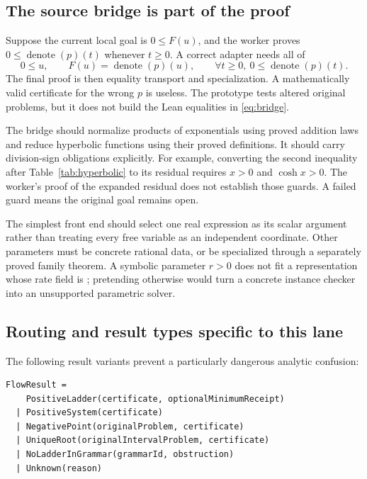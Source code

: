 \subsection{The source bridge is part of the proof}

Suppose the current local goal is $0\le F(u)$, and the worker proves $0\le\operatorname{denote}(p)(t)$ whenever $t\ge0$. A correct adapter needs all of
\begin{equation}
 0\le u,\qquad F(u)=\operatorname{denote}(p)(u),\qquad
 \forall t\ge0,\ 0\le\operatorname{denote}(p)(t).
 \label{eq:bridge}
\end{equation}
The final proof is then equality transport and specialization. A mathematically valid certificate for the wrong $p$ is useless. The prototype tests altered original problems, but it does not build the Lean equalities in \eqref{eq:bridge}.

The bridge should normalize products of exponentials using proved addition laws and reduce hyperbolic functions using their proved definitions. It should carry division-sign obligations explicitly. For example, converting the second inequality after Table~\ref{tab:hyperbolic} to its residual requires $x>0$ and $\cosh x>0$. The worker's proof of the expanded residual does not establish those guards. A failed guard means the original goal remains open.

The simplest front end should select one real expression as its scalar argument rather than treating every free variable as an independent coordinate. Other parameters must be concrete rational data, or be specialized through a separately proved family theorem. A symbolic parameter $r>0$ does not fit a representation whose rate field is ; pretending otherwise would turn a concrete instance checker into an unsupported parametric solver.

\subsection{Routing and result types specific to this lane}

The following result variants prevent a particularly dangerous analytic confusion:
\par\noindent\begin{minipage}{\textwidth}
\begin{lstlisting}
FlowResult =
    PositiveLadder(certificate, optionalMinimumReceipt)
  | PositiveSystem(certificate)
  | NegativePoint(originalProblem, certificate)
  | UniqueRoot(originalIntervalProblem, certificate)
  | NoLadderInGrammar(grammarId, obstruction)
  | Unknown(reason)
\end{lstlisting}
\end{minipage}\par

